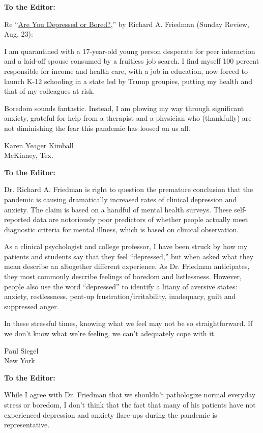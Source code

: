 \textbf{To the Editor:}

Re
``\href{https://www.nytimes3xbfgragh.onion/2020/08/21/opinion/sunday/covid-depression-boredom.html}{Are
You Depressed or Bored?},'' by Richard A. Friedman (Sunday Review, Aug.
23):

I am quarantined with a 17-year-old young person desperate for peer
interaction and a laid-off spouse consumed by a fruitless job search. I
find myself 100 percent responsible for income and health care, with a
job in education, now forced to launch K-12 schooling in a state led by
Trump groupies, putting my health and that of my colleagues at risk.

Boredom sounds fantastic. Instead, I am plowing my way through
significant anxiety, grateful for help from a therapist and a physician
who (thankfully) are not diminishing the fear this pandemic has loosed
on us all.

Karen Yeager Kimball\\
McKinney, Tex.

\textbf{To the Editor:}

Dr. Richard A. Friedman is right to question the premature conclusion
that the pandemic is causing dramatically increased rates of clinical
depression and anxiety. The claim is based on a handful of mental health
surveys. These self-reported data are notoriously poor predictors of
whether people actually meet diagnostic criteria for mental illness,
which is based on clinical observation.

As a clinical psychologist and college professor, I have been struck by
how my patients and students say that they feel ``depressed,'' but when
asked what they mean describe an altogether different experience. As Dr.
Friedman anticipates, they most commonly describe feelings of boredom
and listlessness. However, people also use the word ``depressed'' to
identify a litany of aversive states: anxiety, restlessness, pent-up
frustration/irritability, inadequacy, guilt and suppressed anger.

In these stressful times, knowing what we feel may not be so
straightforward. If we don't know what we're feeling, we can't
adequately cope with it.

Paul Siegel\\
New York

\textbf{To the Editor:}

While I agree with Dr. Friedman that we shouldn't pathologize normal
everyday stress or boredom, I don't think that the fact that many of his
patients have not experienced depression and anxiety flare-ups during
the pandemic is representative.

